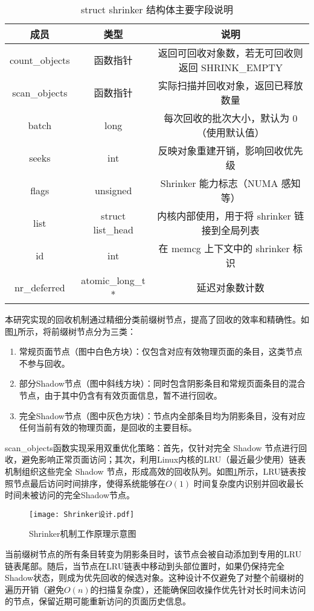 \begin{table}[htbp]
  \centering
  \caption{struct shrinker 结构体主要字段说明}
  \label{tab:shrinker_struct}
  \begin{tabular}{ccc}
    \toprule
    \textbf{成员} & \textbf{类型} & \textbf{说明} \\
    \midrule
    count\_objects & 函数指针 & 返回可回收对象数，若无可回收则返回 SHRINK\_EMPTY \\
    scan\_objects & 函数指针 & 实际扫描并回收对象，返回已释放数量 \\
    batch & long & 每次回收的批次大小，默认为 0（使用默认值） \\
    seeks & int & 反映对象重建开销，影响回收优先级 \\
    flags & unsigned & Shrinker 能力标志（NUMA 感知等） \\
    list & struct list\_head & 内核内部使用，用于将 shrinker 链接到全局列表 \\
    id & int & 在 memcg 上下文中的 shrinker 标识 \\
    nr\_deferred & atomic\_long\_t * & 延迟对象数计数 \\
    \bottomrule
  \end{tabular}
\end{table}

本研究实现的回收机制通过精细分类前缀树节点，提高了回收的效率和精确性。如图\ref{fig:shrink}所示，将前缀树节点分为三类：


\begin{enumerate}
  \item 常规页面节点（图中白色方块）：仅包含对应有效物理页面的条目，这类节点不参与回收。
  \item 部分Shadow节点（图中斜线方块）：同时包含阴影条目和常规页面条目的混合节点，由于其中仍含有有效页面信息，暂不进行回收。
  \item 完全Shadow节点（图中灰色方块）：节点内全部条目均为阴影条目，没有对应任何当前有效的物理页面，是回收的主要目标。
\end{enumerate}
scan\_objects函数实现采用双重优化策略：首先，仅针对完全 Shadow 节点进行回收，避免影响正常页面访问；其次，利用Linux内核的LRU（最近最少使用）链表机制组织这些完全 Shadow 节点，形成高效的回收队列。如图\ref{fig:shrink}所示，LRU链表按照节点最后访问时间排序，使得系统能够在\( O(1) \) 时间复杂度内识别并回收最长时间未被访问的完全Shadow节点。
\begin{figure}[htbp]
  \centering
  \texttt{[image: Shrinker设计.pdf]}
  \caption{Shrinker机制工作原理示意图}
  \label{fig:shrink}
\end{figure}
当前缀树节点的所有条目转变为阴影条目时，该节点会被自动添加到专用的LRU链表尾部。随后，当节点在LRU链表中移动到头部位置时，如果仍保持完全Shadow状态，则成为优先回收的候选对象。这种设计不仅避免了对整个前缀树的遍历开销（避免\(O(n)\)的扫描复杂度），还能确保回收操作优先针对长时间未访问的节点，保留近期可能重新访问的页面历史信息。

